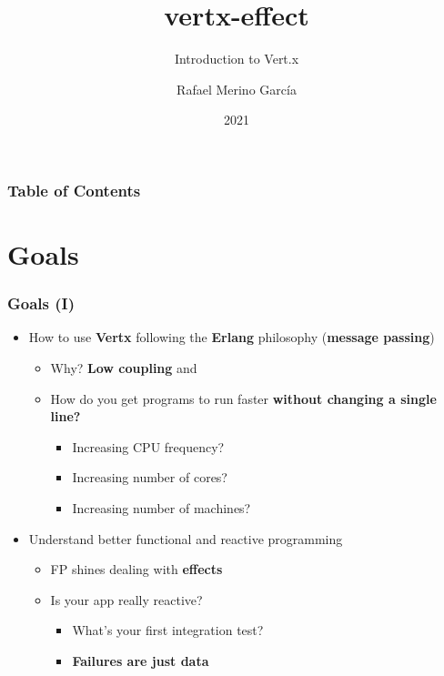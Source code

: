 \documentclass{beamer}
\title{vertx-effect}
\subtitle{Introduction to Vert.x}
\author{Rafael Merino García}
\institute{Github: \href{https://github.com/whocares/imrafaelmerino}{imrafaelmerino}}
\date{2021}
\begin{document}
\frame{\titlepage}

\begin{frame}
\frametitle{Table of Contents}
\tableofcontents
\end{frame}

\section{Goals}

\begin{frame}
\frametitle{Goals (I)}
\begin{itemize}
    \item<1-> How to use  \textbf{Vertx} following the \textbf{Erlang} philosophy (\textbf{message passing})
    \begin{itemize}
        \item<2-> Why? \textbf{Low coupling} and  
        \item<3-> How do you get programs to run faster  \textbf{without changing a single line?}
            \begin{itemize}
               \item<4-> Increasing CPU frequency?      
               \item<5-> Increasing number of cores?
               \item<6-> Increasing number of machines?
            \end{itemize}    
     \end{itemize}    
    \item<7-> Understand better functional and reactive programming
    \begin{itemize}
        \item<8-> FP shines dealing with \textbf{effects}       
        \item<9-> Is your app really reactive? 
            \begin{itemize}
                 \item<10-> What's your first integration test?      
                 \item<11-> \textbf{Failures are just data}
           \end{itemize}   
    \end{itemize}    
\end{itemize}    
\end{frame} 
\end{document}
